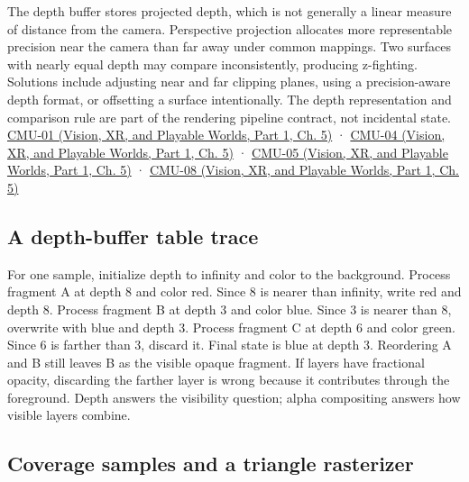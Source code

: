 The depth buffer stores projected depth, which is not generally a linear measure of distance from the camera. Perspective projection allocates more representable precision near the camera than far away under common mappings. Two surfaces with nearly equal depth may compare inconsistently, producing z-fighting. Solutions include adjusting near and far clipping planes, using a precision-aware depth format, or offsetting a surface intentionally. The depth representation and comparison rule are part of the rendering pipeline contract, not incidental state. \href{../07-Vision-XR-and-Playable-Worlds-P01/main.pdf\#nameddest=04-visual-computing-ii-ch036-cmu-01---course-overview}{CMU-01 (Vision, XR, and Playable Worlds, Part 1, Ch. 5)} · \href{../07-Vision-XR-and-Playable-Worlds-P01/main.pdf\#nameddest=04-visual-computing-ii-ch036-cmu-04---drawing-a-triangle-and-an-intro-to-sampling}{CMU-04 (Vision, XR, and Playable Worlds, Part 1, Ch. 5)} · \href{../07-Vision-XR-and-Playable-Worlds-P01/main.pdf\#nameddest=04-visual-computing-ii-ch036-cmu-05---spatial-transformations}{CMU-05 (Vision, XR, and Playable Worlds, Part 1, Ch. 5)} · \href{../07-Vision-XR-and-Playable-Worlds-P01/main.pdf\#nameddest=04-visual-computing-ii-ch036-cmu-08---depth-and-transparency}{CMU-08 (Vision, XR, and Playable Worlds, Part 1, Ch. 5)}

\subsection{A depth-buffer table trace}\label{03-visual-computing-i-ch015-a-depth-buffer-table-trace}

\hypertarget{03-visual-computing-i-ch015-a-depth-buffer-table-trace}{}

For one sample, initialize depth to infinity and color to the background. Process fragment A at depth 8 and color red. Since 8 is nearer than infinity, write red and depth 8. Process fragment B at depth 3 and color blue. Since 3 is nearer than 8, overwrite with blue and depth 3. Process fragment C at depth 6 and color green. Since 6 is farther than 3, discard it. Final state is blue at depth 3. Reordering A and B still leaves B as the visible opaque fragment. If layers have fractional opacity, discarding the farther layer is wrong because it contributes through the foreground. Depth answers the visibility question; alpha compositing answers how visible layers combine.

\subsection{Coverage samples and a triangle rasterizer}\label{03-visual-computing-i-ch015-coverage-samples-and-a-triangle-rasterizer}

